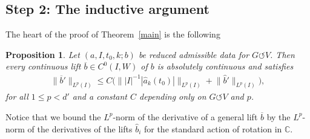 \documentclass[11pt]{article}
\numberwithin{equation}{section}
\numberwithin{equation}{section}
\newtheorem{Proposition}[Theorem]{Proposition}
 { \theoremstyle{definition}
\newtheorem{Definition}[Theorem]{Definition}
\newtheorem{Note}[Theorem]{Note}
\newtheorem{Example}[Theorem]{Example}
\newtheorem{Remark}[Theorem]{Remark}
\newtheorem{Question}[Theorem]{Question} }
\def\C{\mathbb{C}}
\def\ol{\overline}
\def\we{\hat}
\def\acts{\circlearrowleft}
\begin{document}
\subsection*{Step 2: The inductive argument}

The heart of the proof of Theorem~\ref{main} is the following


\begin{Proposition} \label{induction}
 Let $(a, I, t_0, k; b)$ be reduced admissible data for $G \acts V$.
 Then every con\-ti\-nuous lift $\ol b \in C^0(I,W)$ of $b$ is absolutely con\-ti\-nuous and satisfies
 \begin{gather} \label{muab}
 \|\ol b'\|_{L^p(I)} \le C \Big( \| |I|^{-1} {|\we a_k(t_0)|} \|_{L^p (I)}
 + \big\|\we b'\big\|_{L^p (I)}\Big),
 \end{gather}
 for all $1 \le p < d'$ and a constant $C$ depending only on $G \acts V$ and $p$.
\end{Proposition}




\begin{Remark}
 Notice that we bound the $L^p$-norm of the derivative of a general lift $\ol b$
 by the $L^p$-norm of the derivatives of the lifts $\we b_i$ for the standard action of rotation in $\C$.
\end{Remark}
\end{document}
